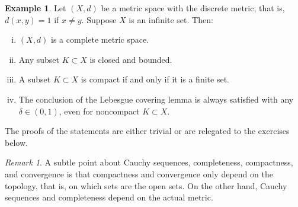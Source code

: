 \documentclass[12pt,openany]{book}
\theoremstyle{plain}
\theoremstyle{remark}
\newtheorem{remark}[thm]{Remark}
\theoremstyle{definition}
\theoremstyle{exercise}
\theoremstyle{example}
\newtheorem{example}[thm]{Example}
\begin{document}
\begin{example}
Let $(X,d)$ be a metric space with the discrete metric, that is, $d(x,y) = 1$
if $x \neq y$.  Suppose
$X$ is an infinite set.  Then:
\begin{enumerate}[(i)]
\item $(X,d)$ is a complete metric space.
\item Any subset $K \subset X$ is closed and bounded.
\item A subset $K \subset X$ is compact if and only if it is a finite set.
\item The conclusion of the Lebesgue covering lemma is always satisfied
with any $\delta \in (0,1)$, even for noncompact $K \subset X$.
\end{enumerate}
The proofs
of the statements are either trivial or are relegated to the exercises
below.
\end{example}

\begin{remark}
A subtle point about Cauchy sequences, completeness, compactness,
and convergence is that compactness and convergence only depend on the
topology, that is, on which sets are the open sets.  On the other hand,
Cauchy sequences and completeness depend on the actual metric.
\end{remark}
\end{document}
